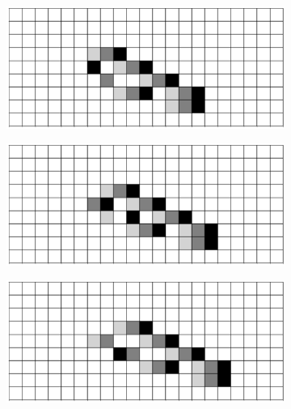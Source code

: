 \documentclass[12pt]{article}
\numberwithin{figure}{section} %
\begin{document}
\begin{figure}[H]
\begin{subfigure}{0.45\textwidth}
   	\end{subfigure}
	\newline
	\begin{subfigure}{0.45\textwidth}
     		\includegraphics[width=\linewidth]{Section4/35.6}
     		\subcaption{}
   	\end{subfigure}
    	\begin{subfigure}{0.45\textwidth}
     		\includegraphics[width=\linewidth]{Section4/35.7}
     		\subcaption{}
   	\end{subfigure}
	\newline
	\begin{subfigure}{0.45\textwidth}
     		\includegraphics[width=\linewidth]{Section4/35.8}

\end{subfigure}
\end{figure}
\end{document}
